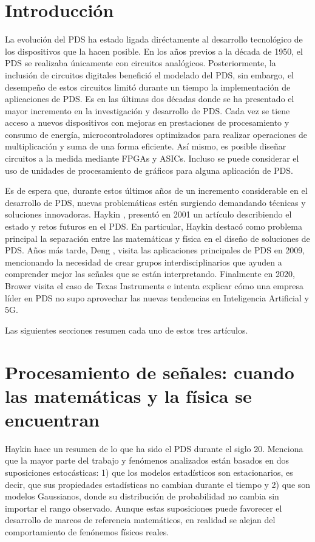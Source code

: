 \documentclass[11pt, twocolumn]{article}
\begin{document}
\section{Introducción}
La evolución del PDS ha estado ligada diréctamente al desarrollo tecnológico de los dispositivos que la hacen posible. En los años previos a la década de 1950, el PDS se realizaba únicamente con circuitos analógicos. Posteriormente, la inclusión de circuitos digitales benefició el modelado del PDS, sin embargo, el desempeño de estos circuitos limitó durante un tiempo la implementación de aplicaciones de PDS. Es en las últimas dos décadas donde se ha presentado el mayor incremento en la investigación y desarrollo de PDS. Cada vez se tiene acceso a nuevos dispositivos con mejoras en prestaciones de procesamiento y consumo de energía, microcontroladores optimizados para realizar operaciones de multiplicación y suma de una forma eficiente. Así mismo, es posible diseñar circuitos a la medida mediante FPGAs y ASICs. Incluso se puede considerar el uso de unidades de procesamiento de gráficos para alguna aplicación de PDS.

Es de espera que, durante estos últimos años de un incremento considerable en el desarrollo de PDS, nuevas problemáticas estén surgiendo demandando técnicas y soluciones innovadoras. Haykin \cite{haykin}, presentó en 2001 un artículo describiendo el estado y retos futuros en el PDS. En particular, Haykin destacó como problema principal la separación entre las matemáticas y física en el diseño de soluciones de PDS. Años más tarde, Deng \cite{golden_age}, visita las aplicaciones principales de PDS en 2009, mencionando la necesidad de crear grupos interdisciplinarios que ayuden a comprender mejor las señales que se están interpretando. Finalmente en 2020, Brower \cite{dps_dead} visita el caso de Texas Instruments e intenta explicar cómo una empresa líder en PDS no supo aprovechar las nuevas tendencias en Inteligencia Artificial y 5G.

Las siguientes secciones resumen cada uno de estos tres artículos.

\section{Procesamiento de señales: cuando las matemáticas y la física se encuentran}
Haykin \cite{haykin} hace un resumen de lo que ha sido el PDS durante el siglo 20. Menciona que la mayor parte del trabajo  y fenómenos analizados están basados en dos suposiciones estocásticas: 1) que los modelos estadísticos son estacionarios, es decir, que sus propiedades estadísticas no cambian durante el tiempo y 2) que son modelos Gaussianos, donde su distribución de probabilidad no cambia sin importar el rango observado. Aunque estas suposiciones puede favorecer el desarrollo de marcos de referencia matemáticos, en realidad se alejan del comportamiento de fenónemos físicos reales.
\end{document}

